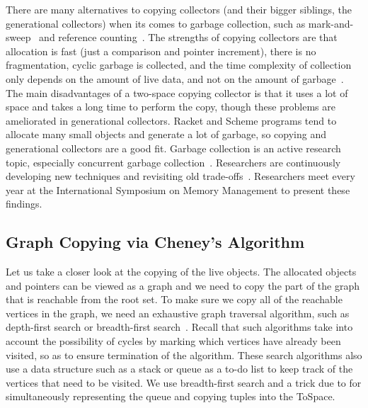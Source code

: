 \documentclass[11pt]{book}
\begin{document}
There are many alternatives to copying collectors (and their bigger
siblings, the generational collectors) when its comes to garbage
collection, such as mark-and-sweep~\citep{McCarthy:1960dz} and
reference counting~\citep{Collins:1960aa}.  The strengths of copying
collectors are that allocation is fast (just a comparison and pointer
increment), there is no fragmentation, cyclic garbage is collected,
and the time complexity of collection only depends on the amount of
live data, and not on the amount of garbage~\citep{Wilson:1992fk}. The
main disadvantages of a two-space copying collector is that it uses a
lot of space and takes a long time to perform the copy, though these
problems are ameliorated in generational collectors.  Racket and
Scheme programs tend to allocate many small objects and generate a lot
of garbage, so copying and generational collectors are a good fit.
Garbage collection is an active research topic, especially concurrent
garbage collection~\citep{Tene:2011kx}. Researchers are continuously
developing new techniques and revisiting old
trade-offs~\citep{Blackburn:2004aa,Jones:2011aa,Shahriyar:2013aa,Cutler:2015aa,Shidal:2015aa,Osterlund:2016aa,Jacek:2019aa,Gamari:2020aa}. Researchers
meet every year at the International Symposium on Memory Management to
present these findings.


\subsection{Graph Copying via Cheney's Algorithm}
\label{sec:cheney}
Let us take a closer look at the copying of the live objects. The
allocated objects and pointers can be viewed as a graph and we need to
copy the part of the graph that is reachable from the root set. To
make sure we copy all of the reachable vertices in the graph, we need
an exhaustive graph traversal algorithm, such as depth-first search or
breadth-first search~\citep{Moore:1959aa,Cormen:2001uq}. Recall that
such algorithms take into account the possibility of cycles by marking
which vertices have already been visited, so as to ensure termination
of the algorithm. These search algorithms also use a data structure
such as a stack or queue as a to-do list to keep track of the vertices
that need to be visited. We use breadth-first search and a trick
due to \citet{Cheney:1970aa} for simultaneously representing the queue
and copying tuples into the ToSpace.
\end{document}

